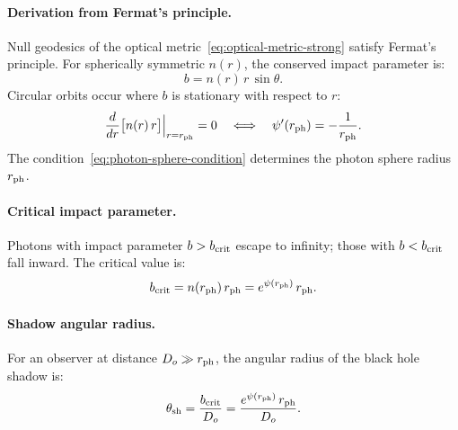 \paragraph{Derivation from Fermat's principle.}
Null geodesics of the optical metric~\eqref{eq:optical-metric-strong} satisfy Fermat's principle. For spherically symmetric $n(r)$, the conserved impact parameter is:
\begin{equation}
b = n(r)\, r\, \sin\theta.
\end{equation}
Circular orbits occur where $b$ is stationary with respect to $r$:
\begin{equation}\label{eq:photon-sphere-condition}
\frac{d}{dr}\big[n(r)\, r\big]\Big|_{r=r_{\rm ph}} = 0 \quad \Longleftrightarrow \quad \psi'(r_{\rm ph}) = -\frac{1}{r_{\rm ph}}.
\end{equation}
The condition~\eqref{eq:photon-sphere-condition} determines the photon sphere radius $r_{\rm ph}$.

\paragraph{Critical impact parameter.}
Photons with impact parameter $b > b_{\rm crit}$ escape to infinity; those with $b < b_{\rm crit}$ fall inward. The critical value is:
\begin{equation}\label{eq:b-crit}
b_{\rm crit} = n(r_{\rm ph})\, r_{\rm ph} = e^{\psi(r_{\rm ph})}\, r_{\rm ph}.
\end{equation}

\paragraph{Shadow angular radius.}
For an observer at distance $D_o \gg r_{\rm ph}$, the angular radius of the black hole shadow is:
\begin{equation}\label{eq:shadow-radius}
\theta_{\rm sh} = \frac{b_{\rm crit}}{D_o} = \frac{e^{\psi(r_{\rm ph})}\, r_{\rm ph}}{D_o}.
\end{equation}

